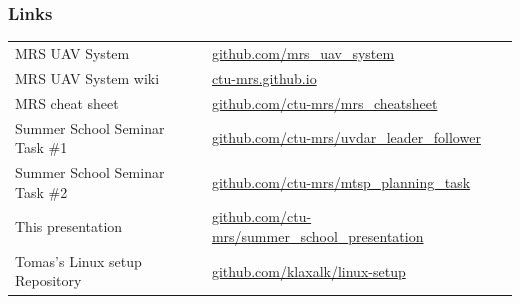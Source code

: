 \documentclass[aspectratio=1610]{beamer}
\begin{document}

  \begin{frame}
    \frametitle{Links}

    \begin{tabular}{ll}

      MRS UAV System & {\small \url{github.com/mrs_uav_system}}\\
      MRS UAV System wiki                       & {\small \url{ctu-mrs.github.io}}\\
      MRS cheat sheet                & {\small \url{github.com/ctu-mrs/mrs_cheatsheet}}\\
      Summer School Seminar Task \#1 & {\small \url{github.com/ctu-mrs/uvdar_leader_follower}}\\
      Summer School Seminar Task \#2 & {\small \url{github.com/ctu-mrs/mtsp_planning_task}}\\
      This presentation              & {\small \url{github.com/ctu-mrs/summer_school_presentation}}\\
      Tomas's Linux setup Repository & {\small \url{github.com/klaxalk/linux-setup}}\\
    \end{tabular}

  \end{frame}

\end{document}
